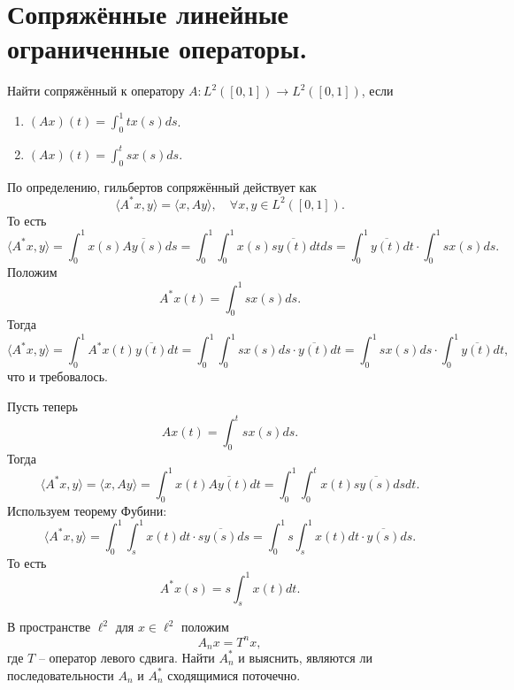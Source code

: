 \section{Сопряжённые линейные ограниченные операторы.}
\begin{task}[11.1]
    Найти сопряжённый к оператору $A\colon L^2([0, 1]) \to L^2([0, 1])$, если
    \begin{enumerate}
        \item $(Ax)(t) = \int_0^1 t x(s)ds$.
        \item $(Ax)(t) = \int_0^t s x(s)ds$.
    \end{enumerate}
\end{task}
\begin{solution}
    По определению, гильбертов сопряжённый действует как
    \[
        \langle A^* x, y \rangle = \langle x, Ay \rangle, \quad \forall x, y \in L^2([0, 1]).
    \]
    То есть
    \[
        \langle A^{*} x, y \rangle = \int_{0}^{1} x(s) \overline{Ay(s)}ds = \int_{0}^{1}\int_{0}^{1} x(s) s \overline{y(t)}dtds = \int_0^1 \overline{y(t)}dt \cdot \int_0^1 s x(s)ds.
    \]
    Положим
    \[
        A^* x(t) = \int_0^1 s x(s)ds.
    \]
    Тогда
    \[
        \langle A^* x, y \rangle = \int_0^1 A^* x(t) \overline{y(t)}dt = \int_0^1 \int_0^1 s x(s)ds \cdot \overline{y(t)}dt = \int_0^1 s x(s)ds \cdot \int_0^1 \overline{y(t)}dt,
    \]
    что и требовалось.

    Пусть теперь
    \[
        Ax(t) = \int_0^t s x(s) ds.
    \]
    Тогда
    \[
        \langle A^* x, y \rangle = \langle x, Ay \rangle = \int_0^1 x(t) \overline{Ay(t)}dt = \int_0^1 \int_0^t x(t) s \overline{y(s)}dsdt.
    \]
    Используем теорему Фубини:
    \[
        \langle A^* x, y \rangle = \int_0^1 \int_s^{1} x(t)dt \cdot s\overline{y(s)}ds = \int_0^1 s\int_s^1 x(t)dt \cdot \overline{y(s)}ds.
    \]
    То есть
    \[
        A^{*}x(s) = s \int_s^1 x(t)dt.
    \]
\end{solution}
\begin{task}[11.3]
    В пространстве $\ell^2$ для $x \in \ell^2$ положим
    \[
        A_n x = T^n x,
    \]
    где $T$ -- оператор левого сдвига.
    Найти $A_n^*$ и выяснить, являются ли последовательности $A_n$ и $A_n^*$ сходящимися поточечно.
\end{task}
